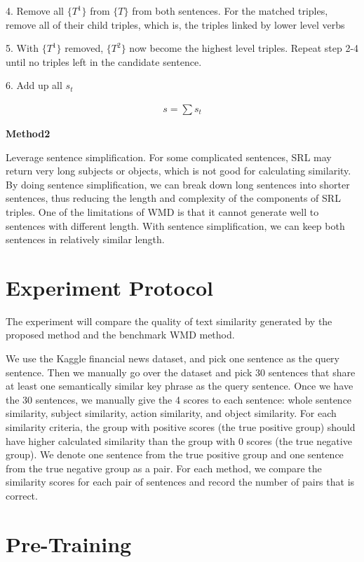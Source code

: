 \documentclass[letterpaper]{article}
\begin{document}
4. Remove all $\{T^1\}$ from $\{T\}$ from both sentences. For the matched triples, remove all of their child triples, which is, the triples linked by lower level verbs 

5. With $\{T^1\}$ removed, $\{T^2\}$ now become the highest level triples. Repeat step 2-4 until no triples left in the candidate sentence.

6. Add up all $s_t$

\begin{align}
s = \sum s_t
\end{align}

\textbf{Method2}

Leverage sentence simplification. For some complicated sentences, SRL may return very long subjects or objects, which is not good for calculating similarity. By doing sentence simplification, we can break down long sentences into shorter sentences, thus reducing the length and complexity of the components of SRL triples. One of the limitations of WMD is that it cannot generate well to sentences with different length. With sentence simplification, we can keep both sentences in relatively similar length.

\section{Experiment Protocol}

The experiment will compare the quality of text similarity generated by the proposed method and the benchmark WMD method.

We use the Kaggle financial news dataset, and pick one sentence as the query sentence. Then we manually go over the dataset and pick 30 sentences that share at least one semantically similar key phrase as the query sentence. Once we have the 30 sentences, we manually give the 4 scores to each sentence: whole sentence similarity, subject similarity, action similarity, and object similarity. For each similarity criteria, the group with positive scores (the true positive group) should have higher calculated similarity than the group with 0 scores (the true negative group). We denote one sentence from the true positive group and one sentence from the true negative group as a pair. For each method, we compare the similarity scores for each pair of sentences and record the number of pairs that is correct.

\section{Pre-Training}
\end{document}
